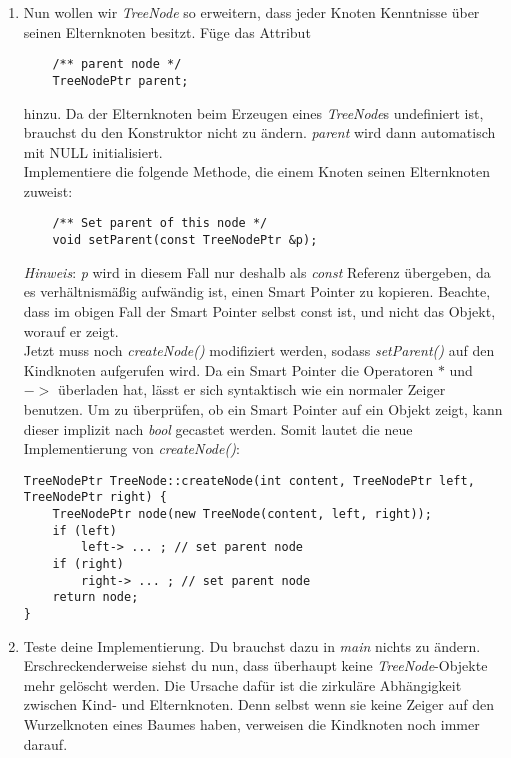 \begin{enumerate}
\item Nun wollen wir \emph{TreeNode} so erweitern, dass jeder Knoten Kenntnisse über seinen Elternknoten besitzt.
Füge das Attribut  
\begin{lstlisting}
	/** parent node */
	TreeNodePtr parent;
\end{lstlisting}

hinzu.
Da der Elternknoten beim Erzeugen eines \emph{TreeNode}s undefiniert ist, brauchst du den Konstruktor nicht zu ändern. \emph{parent} wird dann automatisch mit NULL initialisiert.\\

Implementiere die folgende Methode, die einem Knoten seinen Elternknoten zuweist:
\begin{lstlisting}
	/** Set parent of this node */
	void setParent(const TreeNodePtr &p);
\end{lstlisting}

\emph{Hinweis}:
\emph{p} wird in diesem Fall nur deshalb als \emph{const} Referenz übergeben, da es verhältnismäßig aufwändig ist, einen Smart Pointer zu kopieren.
Beachte, dass im obigen Fall der Smart Pointer selbst const ist, und nicht das Objekt, worauf er zeigt.\\

Jetzt muss noch \emph{createNode()} modifiziert werden, sodass \emph{setParent()} auf den Kindknoten aufgerufen wird. Da ein Smart Pointer die Operatoren $*$ und $->$ überladen hat, lässt er sich syntaktisch wie ein normaler Zeiger benutzen. Um zu überprüfen, ob ein Smart Pointer auf ein Objekt zeigt, kann dieser implizit nach \emph{bool} gecastet werden. Somit lautet die neue Implementierung von \emph{createNode()}:

\begin{lstlisting}
TreeNodePtr TreeNode::createNode(int content, TreeNodePtr left, TreeNodePtr right) {
	TreeNodePtr node(new TreeNode(content, left, right));
	if (left)
		left-> ... ; // set parent node
	if (right)
		right-> ... ; // set parent node
	return node;
}
\end{lstlisting}

\item
Teste deine Implementierung.
Du brauchst dazu in \emph{main} nichts zu ändern.\\

Erschreckenderweise siehst du nun, dass überhaupt keine \emph{TreeNode}-Objekte mehr gelöscht werden.
Die Ursache dafür ist die zirkuläre Abhängigkeit zwischen Kind- und Elternknoten.
Denn selbst wenn sie keine Zeiger auf den Wurzelknoten eines Baumes haben, verweisen die Kindknoten noch immer darauf. \\


\end{enumerate}
